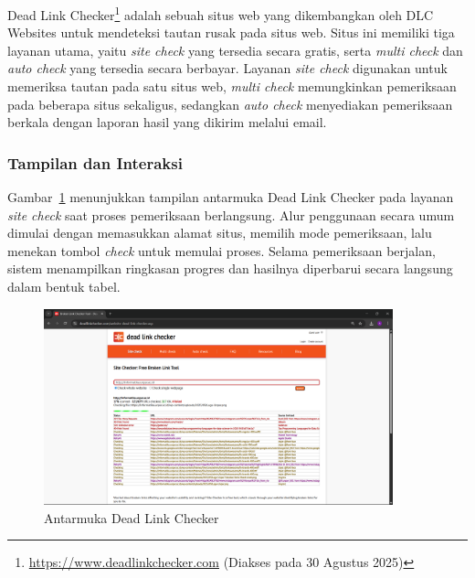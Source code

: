 Dead Link Checker\footnote{\url{https://www.deadlinkchecker.com} (Diakses pada 30 Agustus 2025)} adalah sebuah situs web yang dikembangkan oleh DLC Websites untuk mendeteksi tautan rusak pada situs web. Situs ini memiliki tiga layanan utama, yaitu \textit{site check} yang tersedia secara gratis, serta \textit{multi check} dan \textit{auto check} yang tersedia secara berbayar. Layanan \textit{site check} digunakan untuk memeriksa tautan pada satu situs web, \textit{multi check} memungkinkan pemeriksaan pada beberapa situs sekaligus, sedangkan \textit{auto check} menyediakan pemeriksaan berkala dengan laporan hasil yang dikirim melalui email.

\subsubsection*{Tampilan dan Interaksi}

Gambar~\ref{fig:analisis-deadlinkchecker} menunjukkan tampilan antarmuka Dead Link Checker pada layanan \textit{site check} saat proses pemeriksaan berlangsung. Alur penggunaan secara umum dimulai dengan memasukkan alamat situs, memilih mode pemeriksaan, lalu menekan tombol \textit{check} untuk memulai proses. Selama pemeriksaan berjalan, sistem menampilkan ringkasan progres dan hasilnya diperbarui secara langsung dalam bentuk tabel.


\begin{figure}[H]
    \centering
    \includegraphics[width=0.9\textwidth]{Gambar/030202-dead-link-checker.png}
    \caption{Antarmuka Dead Link Checker}
    \label{fig:analisis-deadlinkchecker}
\end{figure}

